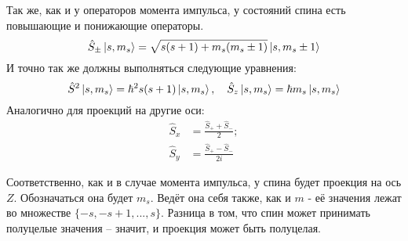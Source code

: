 Так же, как и у операторов момента импульса, у состояний спина есть повышающие и понижающие операторы.
\[
\hat{S}_{\pm}\ket{s, m_s} = \sqrt{s(s+1) + m_s(m_s \pm 1)}\ket{s, m_s \pm 1}
\]
И точно так же должны выполняться следующие уравнения:
\[
\hat{S}^2\ket{s,m_s} = \hbar^2 s(s+ 1)\ket{s,m_s}, \quad \hat{S}_z\ket{s,m_s} = \hbar m_s\ket{s,m_s}
\]
Аналогично для проекций на другие оси:
\begin{align*}
    \hat{S}_x & = \frac{\hat{S}_+ + \hat{S}_-}{2};\\
    \hat{S}_y & = \frac{\hat{S}_+ - \hat{S}_-}{2i}
\end{align*}

Соответственно, как и в случае момента импульса, у спина будет проекция на ось $Z$. Обозначаться она будет $m_s$. Ведёт она себя также, как и $m$ - её значения лежат во множестве $\{-s, -s + 1, ..., s\}$. Разница в том, что спин может принимать полуцелые значения -- значит, и проекция может быть полуцелая.

